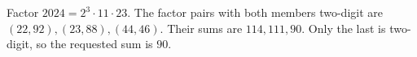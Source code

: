 Factor $2024=2^3\cdot11\cdot23$. The factor pairs with both members two-digit are $(22,92),(23,88),(44,46)$. Their sums are $114,111,90$. Only the last is two-digit, so the requested sum is $\boxed{90}$.
